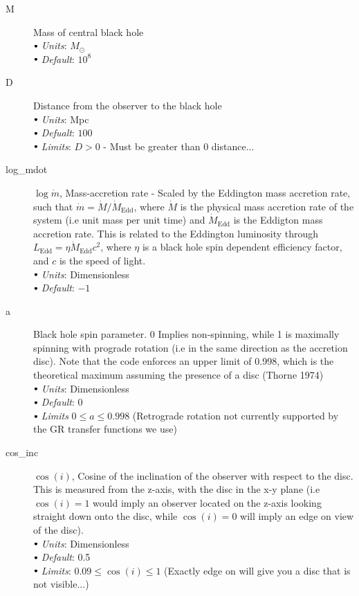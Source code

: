 \documentclass[a4paper, 11pt, times, onecolumn]{article}
\newcommand{\Msol}{M_{\odot}}
\newcommand{\mdot}{\dot{m}}
\newcommand{\Mdot}{\dot{M}}
\newcommand{\Mdedd}{\dot{M}_{\mathrm{Edd}}}
\newcommand{\Ledd}{L_{\mathrm{Edd}}}
\newcommand{\sbt}{\,\begin{picture}(-1,1)(-1,-3)\circle*{3}\end{picture}\ }
\begin{document}
\begin{description}
	\item[M] Mass of central black hole \\
		$\sbt$ {\it Units}: $\Msol$ \\
		$\sbt$ {\it Default}: $10^{8}$ \\

	
	\item[D]  Distance from the observer to the black hole \\
		$\sbt$ {\it Units}: Mpc \\
		$\sbt$ {\it Defualt}: $100$ \\
		$\sbt$ {\it Limits}: $D>0$ - Must be greater than 0 distance...
	
	\item[log\_mdot] $\log \mdot$, Mass-accretion rate - Scaled by the Eddington mass accretion rate, such that $\mdot = \Mdot/\Mdedd$, where $\Mdot$ is the physical mass accretion rate of the system (i.e unit mass per unit time) and $\Mdedd$ is the Eddigton mass accretion rate. This is related to the Eddington luminosity through $\Ledd = \eta \Mdedd c^{2}$, where $\eta$ is a black hole spin dependent efficiency factor, and $c$ is the speed of light. \\
		$\sbt$ {\it Units}: Dimensionless \\
		$\sbt$ {\it Default}: $-1$ \\
	
	\item[a] Black hole spin parameter. 0 Implies non-spinning, while 1 is maximally spinning with prograde rotation (i.e in the same direction as the accretion disc). Note that the code enforces an upper limit of 0.998, which is the theoretical maximum assuming the presence of a disc (Thorne 1974) \\
		$\sbt$ {\it Units}: Dimensionless \\
		$\sbt$ {\it Default}: $0$ \\
		$\sbt$ {\it Limits} $0 \leq a \leq 0.998$ (Retrograde rotation not currently supported by the GR transfer functions we use)
	
	\item[cos\_inc]  $\cos(i)$, Cosine of the inclination of the observer with respect to the disc. This is measured from the z-axis, with the disc in the x-y plane (i.e $\cos(i) = 1$ would imply an observer located on the z-axis looking straight down onto the disc, while $\cos(i) = 0$ will imply an edge on view of the disc). \\
		$\sbt$ {\it Units}: Dimensionless \\
		$\sbt$ {\it Default}: 0.5 \\
		$\sbt$ {\it Limits}: $0.09 \leq \cos(i) \leq 1$ (Exactly edge on will give you a disc that is not visible...) 
	

\end{description}
\end{document}
